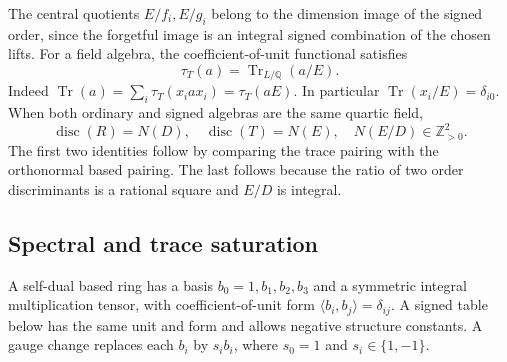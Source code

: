 \documentclass[11pt,a4paper]{article}
\theoremstyle{definition}\newtheorem{definition}[theorem]{Definition}
\theoremstyle{remark}\newtheorem{remark}[theorem]{Remark}
\DeclareMathOperator{\Tr}{Tr}
\newcommand{\Q}{\mathbb Q}
\newcommand{\ZZ}{\mathbb Z}
\DeclareMathOperator{\disc}{disc}
\numberwithin{equation}{section}
\begin{document}
The central quotients $E/f_i,E/g_i$ belong to the dimension image of
the signed order, since the forgetful image is an integral signed
combination of the chosen lifts.
For a field algebra, the coefficient-of-unit functional satisfies
\begin{equation}\label{core:frobenius-trace}
\tau_T(a)=\Tr_{L/\Q}(a/E).
\end{equation}
Indeed $\Tr(a)=\sum_i\tau_T(x_i a x_i)=\tau_T(aE)$.
In particular $\Tr(x_i/E)=\delta_{i0}$.
When both ordinary and signed algebras are the same quartic field,
\begin{equation}\label{core:discriminants}
\disc(R)=N(D),\quad \disc(T)=N(E),\quad N(E/D)\in\ZZ_{>0}^2.
\end{equation}
The first two identities follow by comparing the trace pairing with
the orthonormal based pairing. The last follows because the ratio
of two order discriminants is a rational square and $E/D$ is integral.

\subsection{Spectral and trace saturation}

A self-dual based ring has a basis $b_0=1,b_1,b_2,b_3$ and a symmetric
integral multiplication tensor, with coefficient-of-unit form
$\langle b_i,b_j\rangle=\delta_{ij}$. A signed table below has the same
unit and form and allows negative structure constants.
A gauge change replaces each $b_i$ by $s_i b_i$, where $s_0=1$ and
$s_i\in\{1,-1\}$.
\end{document}
